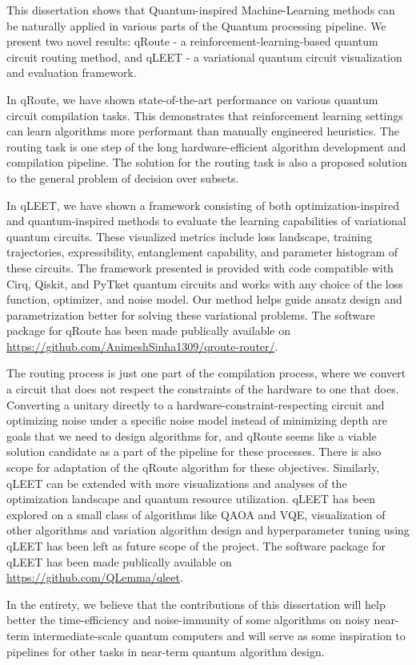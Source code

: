 This dissertation shows that Quantum-inspired Machine-Learning methods can be naturally applied in various parts of the Quantum processing pipeline. We present two novel results: qRoute - a reinforcement-learning-based quantum circuit routing method, and qLEET - a variational quantum circuit visualization and evaluation framework.

In qRoute, we have shown state-of-the-art performance on various quantum circuit compilation tasks. This demonstrates that reinforcement learning settings can learn algorithms more performant than manually engineered heuristics. The routing task is one step of the long hardware-efficient algorithm development and compilation pipeline. The solution for the routing task is also a proposed solution to the general problem of decision over subsets.

In qLEET, we have shown a framework consisting of both optimization-inspired and quantum-inspired methods to evaluate the learning capabilities of variational quantum circuits. These visualized metrics include loss landscape, training trajectories, expressibility, entanglement capability, and parameter histogram of these circuits. The framework presented is provided with code compatible with Cirq, Qiskit, and PyTket quantum circuits and works with any choice of the loss function, optimizer, and noise model. Our method helps guide ansatz design and parametrization better for solving these variational problems.
The software package for qRoute has been made publically available on \url{https://github.com/AnimeshSinha1309/qroute-router/}.

The routing process is just one part of the compilation process, where we convert a circuit that does not respect the constraints of the hardware to one that does. Converting a unitary directly to a hardware-constraint-respecting circuit and optimizing noise under a specific noise model instead of minimizing depth are goals that we need to design algorithms for, and qRoute seems like a viable solution candidate as a part of the pipeline for these processes. There is also scope for adaptation of the qRoute algorithm for these objectives. Similarly, qLEET can be extended with more visualizations and analyses of the optimization landscape and quantum resource utilization. qLEET has been explored on a small class of algorithms like QAOA and VQE, visualization of other algorithms and variation algorithm design and hyperparameter tuning using qLEET has been left as future scope of the project. The software package for qLEET has been made publically available on \url{https://github.com/QLemma/qleet}.

In the entirety, we believe that the contributions of this dissertation will help better the time-efficiency and noise-immunity of some algorithms on noisy near-term intermediate-scale quantum computers and will serve as some inspiration to pipelines for other tasks in near-term quantum algorithm design.
